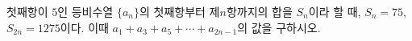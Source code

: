첫째항이 $5$인 등비수열 $\{a_n\}$의 첫째항부터 제$n$항까지의 합을 $S_n$이라 할 때, $S_n=75$, $S_{2n}=1275$이다. 이때 $a_1+a_3+a_5+\cdots+a_{2n-1}$의 값을 구하시오.
